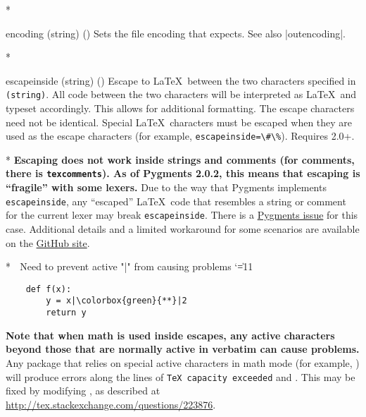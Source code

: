 \begin{paracol}{2}
\begin{optionlist}
\switchcolumn[0]*%
  \item[encoding (string) (\meta{system-specific})]
    Sets the file encoding that  expects.  See also |outencoding|.
    \switchcolumn

\switchcolumn[0]*%
  \item[escapeinside (string) (\meta{none})]
  Escape to \LaTeX\ between the two characters specified in \texttt{\string(string\string)}.  All code between the two characters will be interpreted as \LaTeX\ and typeset accordingly.  This allows for additional formatting.  The escape characters need not be identical.  Special \LaTeX\ characters must be escaped when they are used as the escape characters (for example, \texttt{escapeinside=\textbackslash\#\textbackslash\%}).  Requires  2.0+.
  \switchcolumn

  \switchcolumn[0]*%
\textbf{Escaping does not work inside strings and comments (for comments, there is \texttt{texcomments}).  As of Pygments 2.0.2, this means that escaping is ``fragile'' with some lexers.}  Due to the way that Pygments implements \texttt{escapeinside}, any ``escaped'' \LaTeX\ code that resembles a string or comment for the current lexer may break \texttt{escapeinside}.  There is a \href{https://bitbucket.org/birkenfeld/pygments-main/issue/1118}{Pygments issue} for this case.  Additional details and a limited workaround for some scenarios are available on the \href{https://github.com/gpoore/minted/issues/70#issuecomment-111729930}{ GitHub site}.
\switchcolumn

\switchcolumn[0]*%
\begingroup  ^^A Need to prevent active "|" from causing problems
\catcode`\|=11
\begin{example}
    \begin{verbatim}
    def f(x):
        y = x|\colorbox{green}{**}|2
        return y
    \end{verbatim}
\end{example}
\endgroup

\textbf{Note that when math is used inside escapes, any active characters beyond those that are normally active in verbatim can cause problems.}  Any package that relies on special active characters in math mode (for example, ) will produce errors along the lines of \texttt{TeX capacity exceeded} and \texttt{\string\leavevmode \string\kern \string\z@}.  This may be fixed by modifying \texttt{\string\@noligs}, as described at \url{http://tex.stackexchange.com/questions/223876}.
\switchcolumn


\end{optionlist}
\end{paracol}
